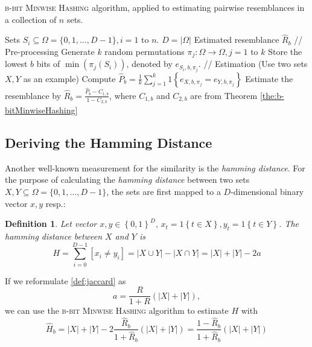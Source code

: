 \documentclass[a4paper]{article}
\newtheorem{mydef}{Definition}
\begin{document}
\begin{algorithm}[H]
\caption{\textsc{b-bit Minwise Hashing} algorithm, applied to estimating pairwise resemblances in a collection of $n$ sets.}
\label{alg:minwiseHashing}
\begin{algorithmic}
\Require Sets $S_i \subseteq \Omega = \{0,1,\ldots,D-1\}, i = 1 \text{ to } n$. \Comment $D = \left| \Omega \right|$
\Ensure Estimated resemblance $\hat{R}_b$
\State // Pre-processing
\State Generate $k$ random permutations $\pi_j: \Omega\longrightarrow\Omega, j=1\text{ to }k$
	\State Store the lowest $b$ bits of $\min(\pi_j(S_i))$, denoted by $e_{S_i,b,\pi_j}$.
\EndFor
\State
\State // Estimation (Use two sets $X,Y$ as an example)
\State Compute $\hat{P}_b = \frac{1}{k}\sum_{j=1}^k 1 \left\lbrace  e_{X,b,\pi_j } = e_{Y,b,\pi_j } \right\rbrace$
\State Estimate the resemblance by $\hat{R}_b = \frac{\hat{P}_b-C_{1,b}}{1-C_{2,b}}$, where $C_{1,b}$ and $C_{2,b}$ are from Theorem \vref{the:b-bitMinwiseHashing}
\end{algorithmic}
\end{algorithm}


\subsection{Deriving the Hamming Distance} \label{sec:hammingDistance}

Another well-known measurement for the similarity is the \emph{hamming distance}. For the purpose of calculating the \emph{hamming distance} between two sets $X,Y \subseteq \Omega = \{0,1,\ldots,D-1\}$, the sets are first mapped to a $D$-dimensional binary vector $x,y$ resp.:
\begin{framed}
\begin{mydef}\label{def:hamming}
Let vector $x,y \in \left\lbrace 0,1 \right\rbrace ^D, \, x_t = 1\left\lbrace t \in X \right\rbrace, y_t = 1\left\lbrace t \in Y \right\rbrace$. The \emph{hamming distance} between $X$ and $Y$ is
\begin{equation}
H=\sum_{i=0}^{D-1}\left[ x_i \neq y_i \right]=|X \cup Y|-|X\cap Y|=|X|+|Y|-2a
\end{equation}
\end{mydef}
\end{framed}

If we reformulate \vref{def:jaccard} as
\begin{equation}
a=\frac{R}{1+R}(|X|+|Y|),
\end{equation}
we can use the \textsc{b-bit Minwise Hashing} algorithm to estimate $H$ with
\begin{equation}
\hat{H}_b=|X|+|Y|-2\frac{\hat{R}_b}{1+\hat{R}_b}(|X|+|Y|)=\frac{1-\hat{R}_b}{1+\hat{R}_b}(|X|+|Y|)
\end{equation}
\end{document}

